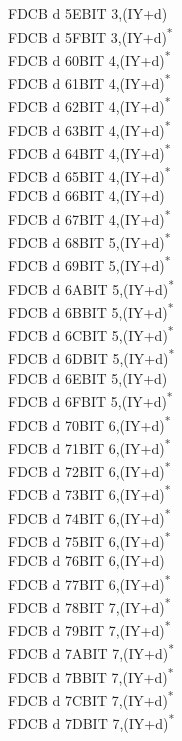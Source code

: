 \documentclass[oneside,a4paper]{book}
\begin{document}
\begin{multicols}{3}
{\begin{tabbing}
FDCB d 5E\>BIT 3,(IY+d)\\
FDCB d 5F\>BIT 3,(IY+d)\textsuperscript{*}\\
FDCB d 60\>BIT 4,(IY+d)\textsuperscript{*}\\
FDCB d 61\>BIT 4,(IY+d)\textsuperscript{*}\\
FDCB d 62\>BIT 4,(IY+d)\textsuperscript{*}\\
FDCB d 63\>BIT 4,(IY+d)\textsuperscript{*}\\
FDCB d 64\>BIT 4,(IY+d)\textsuperscript{*}\\
FDCB d 65\>BIT 4,(IY+d)\textsuperscript{*}\\
FDCB d 66\>BIT 4,(IY+d)\\
FDCB d 67\>BIT 4,(IY+d)\textsuperscript{*}\\
FDCB d 68\>BIT 5,(IY+d)\textsuperscript{*}\\
FDCB d 69\>BIT 5,(IY+d)\textsuperscript{*}\\
FDCB d 6A\>BIT 5,(IY+d)\textsuperscript{*}\\
FDCB d 6B\>BIT 5,(IY+d)\textsuperscript{*}\\
FDCB d 6C\>BIT 5,(IY+d)\textsuperscript{*}\\
FDCB d 6D\>BIT 5,(IY+d)\textsuperscript{*}\\
FDCB d 6E\>BIT 5,(IY+d)\\
FDCB d 6F\>BIT 5,(IY+d)\textsuperscript{*}\\
FDCB d 70\>BIT 6,(IY+d)\textsuperscript{*}\\
FDCB d 71\>BIT 6,(IY+d)\textsuperscript{*}\\
FDCB d 72\>BIT 6,(IY+d)\textsuperscript{*}\\
FDCB d 73\>BIT 6,(IY+d)\textsuperscript{*}\\
FDCB d 74\>BIT 6,(IY+d)\textsuperscript{*}\\
FDCB d 75\>BIT 6,(IY+d)\textsuperscript{*}\\
FDCB d 76\>BIT 6,(IY+d)\\
FDCB d 77\>BIT 6,(IY+d)\textsuperscript{*}\\
FDCB d 78\>BIT 7,(IY+d)\textsuperscript{*}\\
FDCB d 79\>BIT 7,(IY+d)\textsuperscript{*}\\
FDCB d 7A\>BIT 7,(IY+d)\textsuperscript{*}\\
FDCB d 7B\>BIT 7,(IY+d)\textsuperscript{*}\\
FDCB d 7C\>BIT 7,(IY+d)\textsuperscript{*}\\
FDCB d 7D\>BIT 7,(IY+d)\textsuperscript{*}\\

\end{tabbing}}
\end{multicols}
\end{document}
